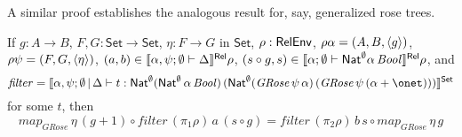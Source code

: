 \documentclass[runningheads]{llncs}
\newcommand{\set}{\mathsf{Set}}
\newcommand{\semmap}{\mathit{map}}
\newcommand{\filtypeGRose}{\Nat^\emptyset 
 (\Nat^\emptyset \, \alpha \, \mathit{Bool})\, (\Nat^\emptyset 
  (\mathit{GRose}\,\psi \, \alpha) \, (\mathit{GRose}\,\psi \, (\alpha
  + \onet)))}
\begin{document}
\begin{comment}
  Consider the case in which $\rho\alpha = (A, B, \graph{g})$. Then $\relsem{\alpha; \emptyset \vdash List \, \alpha} \rho
  = \graph{\mathit{map}_{\mathit{List}} \, g}$, by Lemma~\ref{lem:list-graph}, and $(xs, xs') \in \graph{\mathit{map}_{\mathit{List}} \,g}$ 
  implies $xs' = \mathit{map}_{\mathit{List}} \,g \,xs$. We also have that 
  $(s, s') \in \graph{g} \to \Eq_{\mathit{Bool}}$ implies 
  $\forall (x, g x) \in \graph{g}. \,\, s x = s' (g x)$ and thus
  $s = s' \circ g$ due to the definition of morphisms between relations.
  With these instantiations, Equation~\ref{eq:filter-thm} becomes
  \begin{align*}
    &(t (\pi_1\rho) \,a \,(s' \circ g) \,xs, t (\pi_2\rho) \,b \,s' \,(\mathit{map}_{\mathit{List}} \,g \,xs)) \in \graph{\mathit{map}_{\mathit{List}} \,g}, \\ 
    & i.e., \\ 
    &\mathit{map}_{\mathit{List}} \,g \, (t (\pi_1\rho) \,a \,(s' \circ g) \,xs) = t (\pi_2\rho) \,b \,s' \,(\mathit{map}_{\mathit{List}} \,g \,xs), \\ 
    & i.e., \\
    &\mathit{map}_{\mathit{List}} \,g \circ t (\pi_1 \rho) \, a \, (s' \circ g) = t (\pi_2\rho) \, b \, s' \circ \mathit{map}_{\mathit{List}} \,g
  \end{align*}
  as desired.
\end{proof}
\end{comment}


A similar proof establishes the analogous result for, say, generalized
rose trees. 
\begin{theorem} 
  If $g : A \to B$,
$F, G : \set \to \set$,
  $\eta : F \to G$ in $\set$, $\rho : \mathsf{RelEnv}$, $\rho \alpha =
 (A, B, \langle {g} \rangle)$, $\rho \psi = (F, G, \langle {\eta} \rangle)$, $(a, b) \in
 \llbracket{\alpha, \psi ;\emptyset \vdash \Delta}\rrbracket^{\mathsf{Rel}} \rho$, $(s \circ
 g, s) \in \llbracket{\alpha; \emptyset \vdash \mathsf{Nat}^\emptyset \alpha \,
   \mathit{Bool}}\rrbracket^{\mathsf{Rel}} \rho$, and
 \[ \mathit{filter} = \setsem{\alpha, \psi; \emptyset \,|\, \Delta
      \vdash t : \filtypeGRose}  \]
for some $t$, then
\[ \semmap_{\mathit{GRose}}\, \eta\, (g + 1) \circ \mathit{filter} \,
(\pi_1 \rho) \, a \, (s \circ g) = \mathit{filter} \, (\pi_2\rho) \, b
\, s \circ 
\semmap_{\mathit{GRose}}\, \eta\, g\]
\end{theorem}
\end{document}

